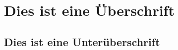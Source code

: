 \documentclass{article}
\begin{document}
\section{Dies ist eine Überschrift}
\subsection{Dies ist eine Unterüberschrift}
\end{document}
